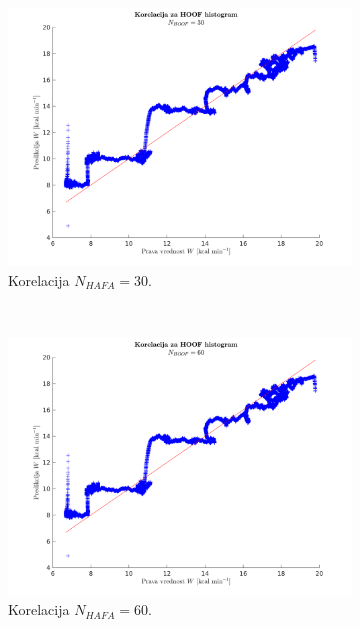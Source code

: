 \begin{figure}[htb]
	\centering
    \begin{subfigure}[t]{0.45\columnwidth}
    	\includegraphics[width=\columnwidth]{./Slike/corr-hafa-30.png}
        \caption{Korelacija $N_{HAFA}=30$.}
        \label{fig:corr-hafa-30}
    \end{subfigure}
    ~
    \begin{subfigure}[t]{0.45\columnwidth}
      \includegraphics[width=\columnwidth]{./Slike/corr-hafa-60.png}
      \caption{Korelacija $N_{HAFA}=60$.}
      \label{fig:corr-hafa-60}
    \end{subfigure}
    ~
    \begin{subfigure}[b]{0.45\columnwidth}

\end{subfigure}
\end{figure}
